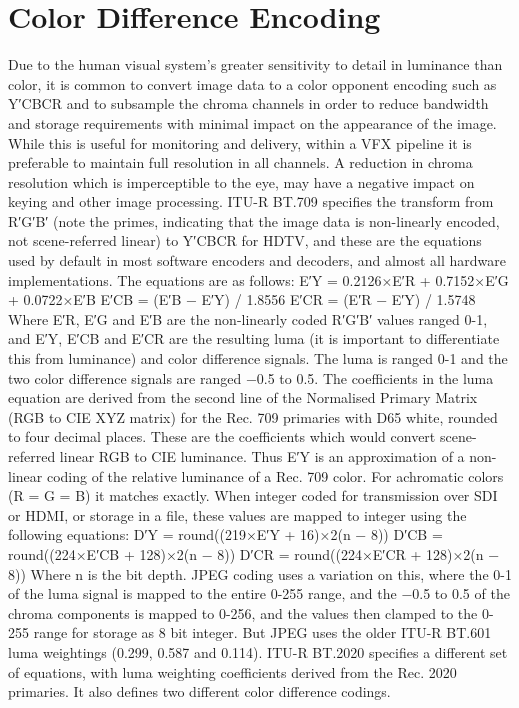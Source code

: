 \section{Color Difference Encoding}

Due to the human visual system’s greater sensitivity to detail in luminance than color, it is common to convert image data to a color opponent encoding such as Y′CBCR and to subsample the chroma channels in order to reduce bandwidth and storage requirements with minimal impact on the appearance of the image. While this is useful for monitoring and delivery, within a VFX pipeline it is preferable to maintain full resolution in all channels. A reduction in chroma resolution which is imperceptible to the eye, may have a negative impact on keying and other image processing.
ITU-R BT.709 specifies the transform from R′G′B′ (note the primes, indicating that the image data is non-linearly encoded, not scene-referred linear) to Y′CBCR for HDTV, and these are the equations used by default in most software encoders and decoders, and almost all hardware implementations. The equations are as follows:
	E′Y = 0.2126×E′R + 0.7152×E′G + 0.0722×E′B
	E′CB =  (E′B − E′Y) / 1.8556
	E′CR =  (E′R − E′Y) / 1.5748
Where E′R, E′G and E′B are the non-linearly coded R′G′B′ values ranged 0-1, and E′Y, E′CB and E′CR are the resulting luma (it is important to differentiate this from luminance) and color difference signals. The luma is ranged 0-1 and the two color difference signals are ranged −0.5 to 0.5.
The coefficients in the luma equation are derived from the second line of the Normalised Primary Matrix (RGB to CIE XYZ matrix) for the Rec. 709 primaries with D65 white, rounded to four decimal places. These are the coefficients which would convert scene-referred linear RGB to CIE luminance. Thus E′Y is an approximation of a non-linear coding of the relative luminance of a Rec. 709 color. For achromatic colors (R = G = B) it matches exactly.
When integer coded for transmission over SDI or HDMI, or storage in a file, these values are mapped to integer using the following equations:
	D′Y = round((219×E′Y + 16)×2(n − 8))
	D′CB = round((224×E′CB + 128)×2(n − 8))
	D′CR = round((224×E′CR + 128)×2(n − 8))
Where n is the bit depth.
JPEG coding uses a variation on this, where the 0-1 of the luma signal is mapped to the entire 0-255 range, and the −0.5 to 0.5 of the chroma components is mapped to 0-256, and the values then clamped to the 0-255 range for storage as 8 bit integer. But JPEG uses the older ITU-R BT.601 luma weightings (0.299, 0.587 and 0.114).
ITU-R BT.2020 specifies a different set of equations, with luma weighting coefficients derived from the Rec. 2020 primaries. It also defines two different color difference codings.
